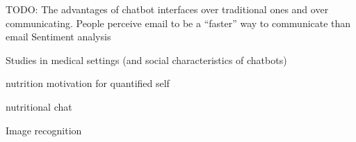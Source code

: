 \documentclass{article}
\begin{document}
TODO: The advantages of chatbot interfaces over traditional ones and over communicating.
People perceive email to be a ``faster'' way to communicate than email
Sentiment analysis

Studies in medical settings (and social characteristics of chatbots)


nutrition motivation for quantified self

nutritional chat

Image recognition
\end{document}

